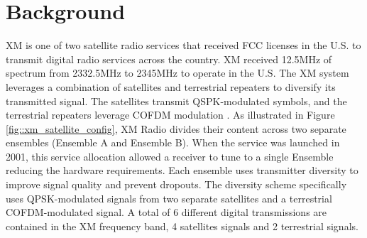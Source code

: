 \documentclass[conference,onecolumn]{IEEEtran}
\begin{document}

\section{Background}


XM is one of two satellite radio services that received FCC licenses in the U.S. to transmit digital radio services across the country.  XM received 12.5MHz of spectrum from 2332.5MHz to 2345MHz to operate in the U.S.  The XM system leverages a combination of satellites and terrestrial repeaters to diversify its transmitted signal. The satellites transmit QSPK-modulated symbols, and the terrestrial repeaters leverage COFDM modulation \cite{5586866}.  As illustrated in Figure \ref{fig::xm_satellite_config}, XM Radio divides their content across two separate ensembles (Ensemble A and Ensemble B).  When the service was launched in 2001, this service allocation allowed a receiver to tune to a single Ensemble reducing the hardware requirements.  Each ensemble uses transmitter diversity to improve signal quality and prevent dropouts. The diversity scheme specifically uses QPSK-modulated signals from two separate satellites and a terrestrial COFDM-modulated signal.  A total of 6 different digital transmissions are contained in the XM frequency band, 4 satellites signals and 2 terrestrial signals.
\end{document}
